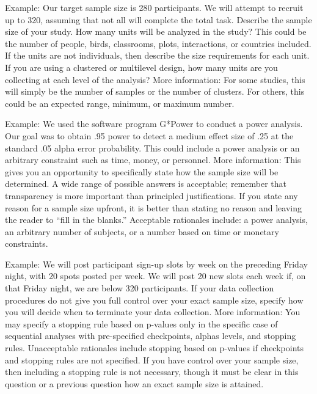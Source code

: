 \documentclass[highlight, explanations]{prereg}
\begin{document}
{Example: Our target sample size is 280 participants. We will attempt to recruit up to 320, assuming that not all will complete the total task. }
{Describe the sample size of your study. How many units will be analyzed in the study? This could be the number of people, birds, classrooms, plots, interactions, or countries included. If the units are not individuals, then describe the size requirements for each unit. If you are using a clustered or multilevel design, how many units are you collecting at each level of the analysis?
More information: For some studies, this will simply be the number of samples or the number of clusters. For others, this could be an expected range, minimum, or maximum number.
}


{Example: We used the software program G*Power to conduct a power analysis. Our goal was to obtain .95 power to detect a medium effect size of .25 at the standard .05 alpha error probability.
}
{This could include a power analysis or an arbitrary constraint such as time, money, or personnel. More information: This gives you an opportunity to specifically state how the sample size will be determined. A wide range of possible answers is acceptable; remember that transparency is more important than principled justifications. If you state any reason for a sample size upfront, it is better than stating no reason and leaving the reader to “fill in the blanks.” Acceptable rationales include: a power analysis, an arbitrary number of subjects, or a number based on time or monetary constraints.
}

{
Example: We will post participant sign-up slots by week on the preceding Friday night, with 20 spots posted per week. We will post 20 new slots each week if, on that Friday night, we are below 320 participants. 
}
{
If your data collection procedures do not give you full control over your exact sample size, specify how you will decide when to terminate your data collection.  More information: You may specify a stopping rule based on p-values only in the specific case of sequential analyses with pre-specified checkpoints, alphas levels, and stopping rules. Unacceptable rationales include stopping based on p-values if checkpoints and stopping rules are not specified. If you have control over your sample size, then including a stopping rule is not necessary, though it must be clear in this question or a previous question how an exact sample size is attained.
}
\end{document}
